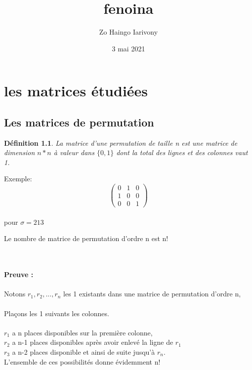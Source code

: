 \documentclass{book}
\title{fenoina}
\author{Zo Haingo Iarivony \bsc{Rakotoarisoa}}
\date{3 mai 2021}
\newtheorem{petit_nom2}{Définition}[chapter]
\begin{document}
\maketitle
\chapter{les matrices étudiées}
\section{Les matrices de permutation}
\begin{petit_nom2}
La matrice d'une permutation de taille n est une matrice de dimension $n * n$ à valeur dans $\{0,1\}$ dont la total des lignes et des colonnes vaut 1.\\
\end{petit_nom2} 

Exemple: \\
\begin{equation}
\begin{pmatrix}
 0&1&0\\1&0&0\\0&0&1
 \end{pmatrix}
\end{equation}
\\
 pour $\sigma=213$ \\
\begin{theorem}
Le nombre de matrice de permutation d'ordre n est n!
\end{theorem} \\\\
\textbf{Preuve : }\\\\
Notons $r_1, r_2, ..., r_n$ les 1 existants dans une matrice de permutation d'ordre n,\\\\ Plaçons les 1 suivants les colonnes. \\\\
$r_1$ a n places disponibles sur la première colonne,\\ $r_2$ a n-1 places disponibles après avoir enlevé la ligne de $r_1$\\
$r_3$ a n-2 places disponible et ainsi de suite jusqu'à $r_n$. 
\\L'ensemble de ces possibilités donne évidemment n!
\end{document}
